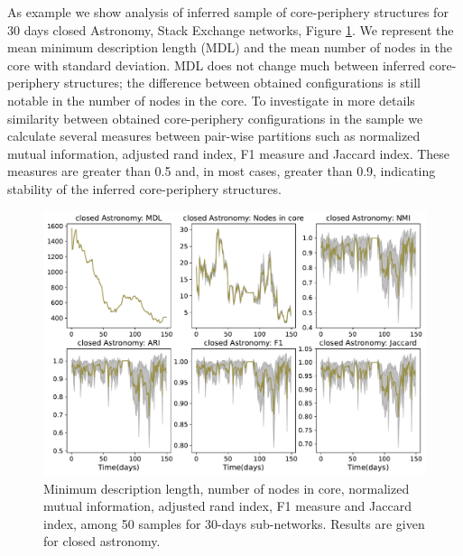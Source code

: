 \clearpage
As example we show analysis of inferred sample of  core-periphery structures for 30 days closed Astronomy, Stack Exchange networks, Figure \ref{fig:sample}. We represent the mean minimum description length (MDL) and the mean number of nodes in the core with standard deviation. MDL does not change much between inferred core-periphery structures; the difference between obtained configurations is still notable in the number of nodes in the core.  To investigate in more details similarity between obtained core-periphery configurations in the sample we calculate several measures between pair-wise partitions such as normalized mutual information, adjusted rand index, F1 measure and Jaccard index. These measures are greater than 0.5 and, in most cases, greater than 0.9, indicating stability of the inferred core-periphery structures.


\begin{figure}[h]
	\centering
	\includegraphics[width=0.8\linewidth]{figures/stackexchange/blockmodel_robust.pdf}
	\caption[Stability of the core-periphery structures.]{Minimum description length, number of nodes in core, normalized mutual information, adjusted rand index, F1 measure and Jaccard index, among 50 samples for 30-days sub-networks. Results are given for closed astronomy. }
	\label{fig:sample}
\end{figure}
